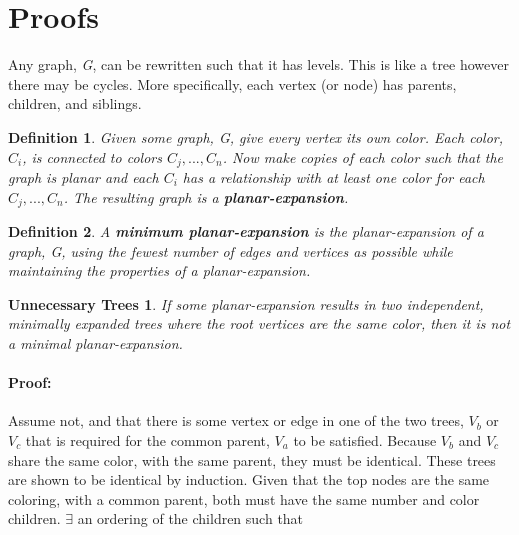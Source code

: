 \documentclass{article}
\newtheorem*{trees}{Unnecessary Trees}
\newtheorem{mydef}{Definition}
\begin{document}


\section{Proofs}
Any graph, \emph{G}, can be rewritten such that it has levels.  This is like a 
tree however there may be cycles.  More specifically, each vertex (or node) has
parents, children, and siblings.\\

\theoremstyle{definition}
\begin{mydef}
Given some graph, \emph{G}, give every vertex its own color. Each color, $C_i$, 
is connected to colors $C_{j},...,C_{n}$. Now make copies of
each color such that the graph is planar and each $C_i$ has a relationship with 
at least one color for each $C_{j},...,C_{n}$.  The resulting graph is a 
\textbf{planar-expansion}.\\
\end{mydef}

\theoremstyle{definition}
\begin{mydef}
A \textbf{minimum planar-expansion} is the planar-expansion of a graph, G, using
the fewest number of edges and vertices as possible while maintaining the 
properties of a planar-expansion.\\
\end{mydef}


\begin{trees}
If some planar-expansion results in two independent, minimally expanded trees 
where the root vertices are the same color, then it is not a minimal 
planar-expansion.
\end{trees}
\paragraph{Proof: }
Assume not, and that there is some vertex or edge in one of the two trees, 
$V_b$ or $V_c$ that is required for the common parent, $V_a$ to be satisfied.
Because $V_b$ and $V_c$ share the same color, with the same parent, they must 
be identical. These trees are shown to be identical by induction.  Given that 
the top nodes are the same coloring, with a common parent, both must have the 
same number and color children.  $\exists$ an ordering of the children such 
that 
\end{document}

